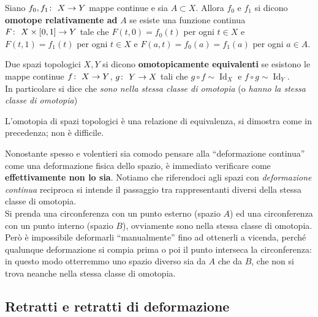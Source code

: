 \begin{definition}
	Siano $f_0, f_1 \colon\ X \rightarrow Y$ mappe continue e sia $A \subset X$. Allora $f_0$ e $f_1$ si dicono \textbf{omotope relativamente ad} $A$ se esiste una funzione continua $F \colon\ X \times \left[0,1\right] \rightarrow Y$ tale che $F(t,0) = f_0(t)$ per ogni $t \in X$ e $F(t,1) = f_1(t)$ per ogni $t \in X$ e $F(a, t) = f_0(a) = f_1(a)$ per ogni $a \in A$.
\end{definition}

\begin{definition}
	Due spazi topologici $X,Y$ si dicono \textbf{omotopicamente equivalenti} se esistono le mappe continue $f \colon\ X \rightarrow Y$, $g \colon\ Y \rightarrow X$ tali che $g \circ f \sim \operatorname{Id}_X$ e $f \circ g \sim \operatorname{Id}_{Y}$. \\ In particolare si dice che \textit{sono nella stessa classe di omotopia} (o \textit{hanno la stessa classe di omotopia})
\end{definition}

\begin{remark}
	L'omotopia di spazi topologici è una relazione di equivalenza, si dimostra come in precedenza; non è difficile.
\end{remark}

\begin{remark} Nonostante spesso e volentieri sia comodo pensare alla \enquote{deformazione continua} come una deformazione fisica dello spazio, è immediato verificare come \textbf{effettivamente non lo sia}. Notiamo che riferendoci agli spazi con \textit{deformazione continua} reciproca si intende il passaggio tra rappresentanti diversi della stessa classe di omotopia. \\ Si prenda una circonferenza con un punto esterno (spazio $A$) ed una circonferenza con un punto interno (spazio $B$), ovviamente sono nella stessa classe di omotopia. Però è impossibile deformarli \enquote{manualmente} fino ad ottenerli a vicenda, perché qualunque deformazione si compia prima o poi il punto interseca la circonferenza: in questo modo otterremmo uno spazio diverso sia da $A$ che da $B$, che non si trova neanche nella stessa classe di omotopia.
\end{remark}

\newpage
\subsection{\textcolor{TopAlg}{\textbf{Retratti e retratti di deformazione}}}


